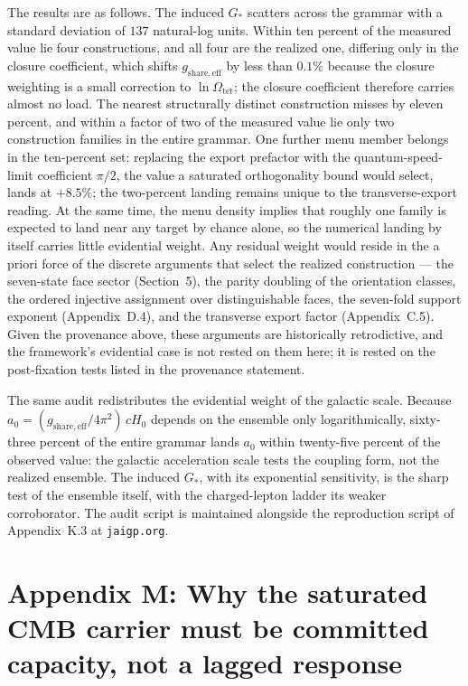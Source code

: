\documentclass[11pt]{article}
\begin{document}
The results are as follows. The induced $G_*$ scatters across the grammar with a standard deviation of $137$ natural-log units. Within ten percent of the measured value lie four constructions, and all four are the realized one, differing only in the closure coefficient, which shifts $g_{\mathrm{share,eff}}$ by less than $0.1\%$ because the closure weighting is a small correction to $\ln\Omega_{\mathrm{tet}}$; the closure coefficient therefore carries almost no load. The nearest structurally distinct construction misses by eleven percent, and within a factor of two of the measured value lie only two construction families in the entire grammar. One further menu member belongs in the ten-percent set: replacing the export prefactor with the quantum-speed-limit coefficient $\pi/2$, the value a saturated orthogonality bound would select, lands at $+8.5\%$; the two-percent landing remains unique to the transverse-export reading. At the same time, the menu density implies that roughly one family is expected to land near any target by chance alone, so the numerical landing by itself carries little evidential weight. Any residual weight would reside in the a priori force of the discrete arguments that select the realized construction --- the seven-state face sector (Section~5), the parity doubling of the orientation classes, the ordered injective assignment over distinguishable faces, the seven-fold support exponent (Appendix~D.4), and the transverse export factor (Appendix~C.5). Given the provenance above, these arguments are historically retrodictive, and the framework's evidential case is not rested on them here; it is rested on the post-fixation tests listed in the provenance statement.

The same audit redistributes the evidential weight of the galactic scale. Because $a_0=(g_{\mathrm{share,eff}}/4\pi^2)\,cH_0$ depends on the ensemble only logarithmically, sixty-three percent of the entire grammar lands $a_0$ within twenty-five percent of the observed value: the galactic acceleration scale tests the coupling form, not the realized ensemble. The induced $G_*$, with its exponential sensitivity, is the sharp test of the ensemble itself, with the charged-lepton ladder its weaker corroborator. The audit script is maintained alongside the reproduction script of Appendix~K.3 at \texttt{jaigp.org}.

\section*{Appendix M: Why the saturated CMB carrier must be committed capacity, not a lagged response}
\end{document}
